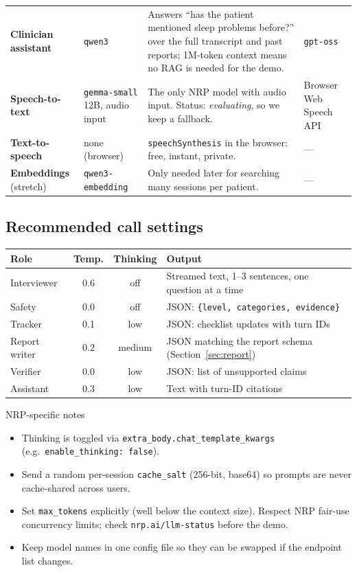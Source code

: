 \documentclass[11pt]{article}
\newcommand{\model}[1]{\texttt{\textcolor{model}{#1}}}
\begin{document}
\begin{tabularx}{\textwidth}{@{}>{\raggedright}p{2.5cm} >{\raggedright}p{2.3cm} X >{\raggedright\arraybackslash}p{2.2cm}@{}}
\textbf{Clinician assistant} & \model{qwen3} & Answers ``has the patient mentioned sleep problems before?'' over the full transcript and past reports; 1M-token context means no RAG is needed for the demo. & \model{gpt-oss} \\
\textbf{Speech-to-text} & \model{gemma-small} \newline 12B, audio input & The only NRP model with audio input. Status: \emph{evaluating}, so we keep a fallback. & Browser Web Speech API \\
\textbf{Text-to-speech} & none (browser) & \texttt{speechSynthesis} in the browser: free, instant, private. & --- \\
\textbf{Embeddings} (stretch) & \model{qwen3-\allowbreak embedding} & Only needed later for searching many sessions per patient. & --- \\
\bottomrule
\end{tabularx}
\normalsize
\renewcommand{\arraystretch}{1.0}

\subsection{Recommended call settings}
\begin{tabularx}{\textwidth}{@{}l c c X@{}}
\toprule
\textbf{Role} & \textbf{Temp.} & \textbf{Thinking} & \textbf{Output} \\
\midrule
Interviewer & 0.6 & off & Streamed text, 1--3 sentences, one question at a time \\
Safety & 0.0 & off & JSON: \texttt{\{level, categories, evidence\}} \\
Tracker & 0.1 & low & JSON: checklist updates with turn IDs \\
Report writer & 0.2 & medium & JSON matching the report schema (Section~\ref{sec:report}) \\
Verifier & 0.0 & low & JSON: list of unsupported claims \\
Assistant & 0.3 & low & Text with turn-ID citations \\
\bottomrule
\end{tabularx}

\begin{notebox}{NRP-specific notes}
\begin{itemize}[leftmargin=*]
  \item Thinking is toggled via \texttt{extra\_body.chat\_template\_kwargs} (e.g.\ \texttt{enable\_thinking: false}).
  \item Send a random per-session \texttt{cache\_salt} (256-bit, base64) so prompts are never cache-shared across users.
  \item Set \texttt{max\_tokens} explicitly (well below the context size). Respect NRP fair-use concurrency limits; check \texttt{nrp.ai/llm-status} before the demo.
  \item Keep model names in one config file so they can be swapped if the endpoint list changes.
\end{itemize}
\end{notebox}
\end{document}
